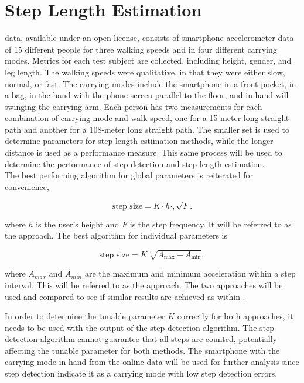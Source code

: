 \section{Step Length Estimation}

\citet{Vezocnik2019} data, available under an open license, consists of smartphone accelerometer data of 15 different people for three walking speeds and in four different carrying modes. Metrics for each test subject are collected, including height, gender, and leg length. The walking speeds were qualitative, in that they were either slow, normal, or fast. The carrying modes include the smartphone in a front pocket, in a bag, in the hand with the phone screen parallel to the floor, and in hand will swinging the carrying arm. Each person has two measurements for each combination of carrying mode and walk speed, one for a 15-meter long straight path and another for a 108-meter long straight path. The smaller set is used to determine parameters for step length estimation methods, while the longer distance is used as a performance measure. This same process will be used to determine the performance of step detection and step length estimation.\\
The best performing algorithm for global parameters is reiterated for convenience,

\begin{equation}
	\label{eq:Tian2016_sle2}
	\text{step size} = K \cdot h \cdot, \sqrt{F}.
\end{equation}


 where $h$ is the user's height and $F$ is the step frequency. It will be referred to as the \citet{Tian2016} approach. The best algorithm for individual parameters is 
 
 \begin{equation}
 	\text{step size} =K \sqrt[4]{A_{\max }-A_{\min }},
 	\label{eq:weinberg_stepsize2}
 \end{equation}
 
 where $A_{max}$ and $A_{min}$ are the maximum and minimum acceleration within a step interval. This will be referred to as the \citet{Weinberg2002} approach. The two approaches will be used and compared to see if similar results are achieved as within \cite{Vezocnik2019}.

In order to determine the tunable parameter $K$ correctly for both approaches, it needs to be used with the output of the step detection algorithm. The step detection algorithm cannot guarantee that all steps are counted, potentially affecting the tunable parameter for both methods. 
The smartphone with the carrying mode in hand from the online data \cite{Vezocnik2019} will be used for further analysis since step detection indicate it as a carrying mode with low step detection errors. \par

